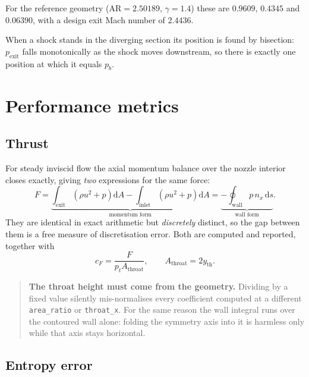 \documentclass[11pt,a4paper]{article}
\newcommand{\code}[1]{\texttt{#1}}
\begin{document}
For the reference geometry ($\mathrm{AR} = 2.50189$, $\gamma = 1.4$) these are
$0.9609$, $0.4345$ and $0.06390$, with a design exit Mach number of $2.4436$.

When a shock stands in the diverging section its position is found by bisection:
$p_{\mathrm{exit}}$ falls monotonically as the shock moves downstream, so there is
exactly one position at which it equals $p_b$.

\section{Performance metrics}
\label{sec:metrics}

\subsection{Thrust}

For steady inviscid flow the axial momentum balance over the nozzle interior
closes exactly, giving \emph{two} expressions for the same force:
\begin{equation}
  F
  = \underbrace{\int_{\mathrm{exit}}\!\left(\rho u^{2} + p\right)\mathrm{d}A
    - \int_{\mathrm{inlet}}\!\left(\rho u^{2} + p\right)\mathrm{d}A}_{\text{momentum form}}
  = \underbrace{-\oint_{\mathrm{wall}} p\, n_x\, \mathrm{d}s}_{\text{wall form}} .
  \label{eq:thrust}
\end{equation}
They are identical in exact arithmetic but \emph{discretely} distinct, so the gap
between them is a free measure of discretisation error.  Both are computed and
reported, together with
\begin{equation}
  c_F = \frac{F}{p_t A_{\mathrm{throat}}},
  \qquad A_{\mathrm{throat}} = 2 y_{\mathrm{th}} .
\end{equation}

\begin{quote}
\textbf{The throat height must come from the geometry.}  Dividing by a fixed
value silently mis-normalises every coefficient computed at a different
\code{area\_ratio} or \code{throat\_x}.  For the same reason the wall integral
runs over the contoured wall alone: folding the symmetry axis into it is
harmless only while that axis stays horizontal.
\end{quote}

\subsection{Entropy error}
\end{document}

